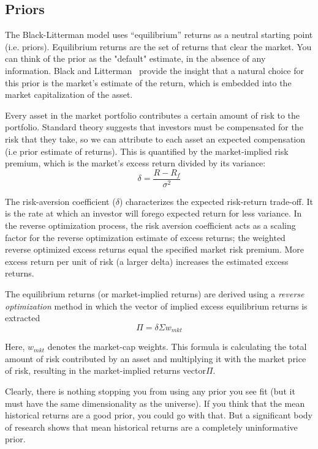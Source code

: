 \subsection{Priors}
The Black-Litterman model uses “equilibrium” returns as a neutral starting point (i.e. priors). Equilibrium returns are the set of returns that clear the market.
You can think of the prior as the "default" estimate, in the absence of any information. Black and Litterman~\cite{bib:black_litterman} provide the insight that a natural choice for this prior is the market’s estimate of the return, which is embedded into the market capitalization of the asset.

Every asset in the market portfolio contributes a certain amount of risk to the portfolio. Standard theory suggests that investors must be compensated for the risk that they take, so we can attribute to each asset an expected compensation (i.e prior estimate of returns). This is quantified by the market-implied risk premium, which is the market’s excess return divided by its variance:
\begin{equation}
	\delta = \frac{R-R_f}{\sigma^2}
\end{equation}

The risk-aversion coefficient ($\delta$) characterizes the expected risk-return trade-off. It is the rate at which an investor will forego expected return for less variance. In the reverse optimization process, the risk aversion coefficient acts as a scaling factor for the reverse optimization estimate of excess returns; the weighted reverse optimized excess returns equal the specified market risk premium. More excess return per unit of risk (a larger delta) increases the estimated excess returns.

The equilibrium returns (or market-implied returns) are derived using a \emph{reverse optimization} method in which the vector of implied excess equilibrium returns is extracted
\begin{equation}
	\Pi=\delta \Sigma w_{mkt}
\end{equation}

Here, $w_{mkt}$ denotes the market-cap weights. This formula is calculating the total amount of risk contributed by an asset and multiplying it with the market price of risk, resulting in the market-implied returns vector$\Pi$.

Clearly, there is nothing stopping you from using any prior you see fit (but it must have the same dimensionality as the universe). If you think that the mean historical returns are a good prior, you could go with that. But a significant body of research shows that mean historical returns are a completely uninformative prior.

